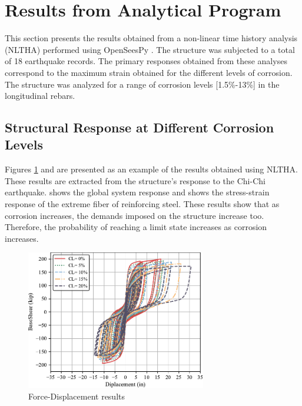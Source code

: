 %
%
\section{Results from Analytical Program}
This section presents the results obtained from a non-linear time history analysis (NLTHA) performed using OpenSeesPy \cite{Zhu2018}. The structure was subjected to a total of 18 earthquake records. The primary responses obtained from these analyses correspond to the maximum strain obtained for the different levels of corrosion. The structure was analyzed for a range of corrosion levels [1.5\%-13\%] in the longitudinal rebars.

\subsection{Structural Response at Different Corrosion Levels}
Figures \ref{fig:Force-Displacement_Results} and  are presented as an example of the results obtained using NLTHA. These results are extracted from the structure's response to the Chi-Chi earthquake.  shows the global system response and  shows the stress-strain response of the extreme fiber of reinforcing steel. These results show that as corrosion increases, the demands imposed on the structure increase too. Therefore, the probability of reaching a limit state increases as corrosion increases.

\begin{figure}[htbp]
	\centering
	\includegraphics[width=0.7\textwidth]{Chapter-5/figs/Force_Diplacement_RSN1505.pdf}
	\caption{Force-Displacement results}
	\label{fig:Force-Displacement_Results}
\end{figure}

